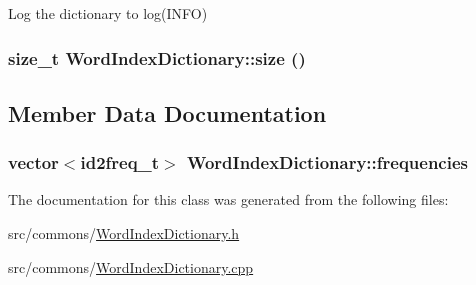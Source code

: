 \label{class_word_index_dictionary_a4781b2b79231219cb3ecbe59e8adb483}
Log the dictionary to log(INFO) \hypertarget{class_word_index_dictionary_ad2cc989f8d453e0353cc6de8e73d4aa0}{
\subsubsection[{size}]{\setlength{\rightskip}{0pt plus 5cm}size\_\-t WordIndexDictionary::size ()}}
\label{class_word_index_dictionary_ad2cc989f8d453e0353cc6de8e73d4aa0}


\subsection{Member Data Documentation}
\hypertarget{class_word_index_dictionary_abcff7bfd6b63bf0a14ba38bf8bb7be9f}{
\subsubsection[{frequencies}]{\setlength{\rightskip}{0pt plus 5cm}vector$<$id2freq\_\-t$>$ {\bf WordIndexDictionary::frequencies}}}
\label{class_word_index_dictionary_abcff7bfd6b63bf0a14ba38bf8bb7be9f}


The documentation for this class was generated from the following files:\begin{DoxyCompactItemize}
\item 
src/commons/\hyperlink{_word_index_dictionary_8h}{WordIndexDictionary.h}\item 
src/commons/\hyperlink{_word_index_dictionary_8cpp}{WordIndexDictionary.cpp}\end{DoxyCompactItemize}
